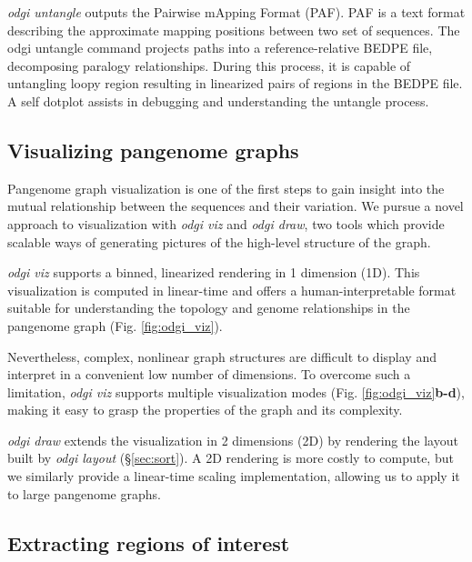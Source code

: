 \documentclass{bioinfo}
\begin{document}
\textit{odgi untangle} outputs the Pairwise mApping Format (PAF). PAF is a text format describing the approximate mapping positions between two set of sequences.
The odgi untangle command projects paths into a reference-relative BEDPE file, decomposing paralogy relationships.
During this process, it is capable of untangling loopy region resulting in linearized pairs of regions in the BEDPE file. A self dotplot assists in debugging and understanding the untangle process.

\subsection{Visualizing pangenome graphs}
\label{sec:viz}


Pangenome graph visualization is one of the first steps to gain insight into the mutual relationship between the sequences and their variation. We pursue a novel approach to visualization with \textit{odgi viz} and \textit{odgi draw}, two tools which provide scalable ways of generating pictures of the high-level structure of the graph.

\textit{odgi viz} supports a binned, linearized rendering in 1 dimension (1D). This visualization is computed in linear-time and offers a human-interpretable format suitable for understanding the topology and genome relationships in the pangenome graph (Fig. \ref{fig:odgi_viz}).

Nevertheless, complex, nonlinear graph structures are difficult to display and interpret in a convenient low number of dimensions.
To overcome such a limitation, \textit{odgi viz} supports multiple visualization modes (Fig. \ref{fig:odgi_viz}\textbf{b-d}), making it easy to grasp the properties of the graph and its complexity.

\textit{odgi draw} extends the visualization in 2 dimensions (2D) by rendering the layout built by \textit{odgi layout} (\S\ref{sec:sort}). A 2D rendering is more costly to compute, but we similarly provide a linear-time scaling implementation, allowing us to apply it to large pangenome graphs.


\subsection{Extracting regions of interest}
\label{sec:extract}
\end{document}
